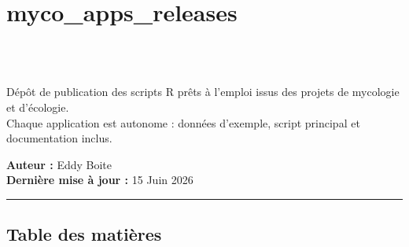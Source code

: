 \section{myco\_apps\_releases}\label{myco_apps_releases}

\href{https://www.r-project.org/}{\pandocbounded{}}\\
\hyperref[-applications-disponibles]{\pandocbounded{}}\\
\hyperref[-applications-disponibles]{\pandocbounded{}}

Dépôt de publication des scripts R prêts à l'emploi issus des projets de
mycologie et d'écologie.\\
Chaque application est autonome : données d'exemple, script principal et
documentation inclus.

\textbf{Auteur :} Eddy Boite\\
\textbf{Dernière mise à jour :} 15 Juin 2026

\begin{center}\rule{0.5\linewidth}{0.5pt}\end{center}

\subsection{Table des matières}\label{table-des-matiuxe8res}

